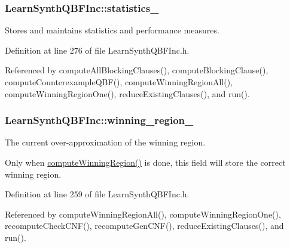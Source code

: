 \hypertarget{classLearnSynthQBFInc_a1f8d3bd97419754ef72759bdda766db4}{
\subsubsection[{statistics\-\_\-}]{ Learn\-Synth\-Q\-B\-F\-Inc\-::statistics\-\_\-\hspace{0.3cm}{\ttfamily [protected]}}}\label{classLearnSynthQBFInc_a1f8d3bd97419754ef72759bdda766db4}


Stores and maintains statistics and performance measures. 



Definition at line 276 of file Learn\-Synth\-Q\-B\-F\-Inc.\-h.



Referenced by compute\-All\-Blocking\-Clauses(), compute\-Blocking\-Clause(), compute\-Counterexample\-Q\-B\-F(), compute\-Winning\-Region\-All(), compute\-Winning\-Region\-One(), reduce\-Existing\-Clauses(), and run().

\hypertarget{classLearnSynthQBFInc_abc3503bdb6be7053a7c3d3d7e57858d6}{
\subsubsection[{winning\-\_\-region\-\_\-}]{ Learn\-Synth\-Q\-B\-F\-Inc\-::winning\-\_\-region\-\_\-\hspace{0.3cm}{\ttfamily [protected]}}}\label{classLearnSynthQBFInc_abc3503bdb6be7053a7c3d3d7e57858d6}


The current over-\/approximation of the winning region. 

Only when \hyperlink{classLearnSynthQBFInc_a2dc9fff9a414a40059a1d89e19b48252}{compute\-Winning\-Region()} is done, this field will store the correct winning region. 

Definition at line 259 of file Learn\-Synth\-Q\-B\-F\-Inc.\-h.



Referenced by compute\-Winning\-Region\-All(), compute\-Winning\-Region\-One(), recompute\-Check\-C\-N\-F(), recompute\-Gen\-C\-N\-F(), reduce\-Existing\-Clauses(), and run().

